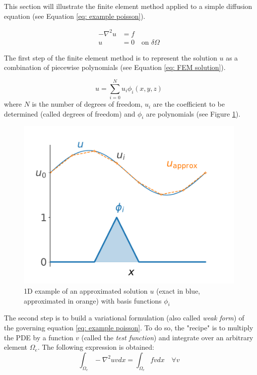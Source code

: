 This section will illustrate the finite element method applied to a simple diffusion equation (see Equation \ref{eq: example poisson}).

\begin{align}
    -\nabla^2 u &= f \\
    u &= 0 \quad \text{on    } \delta \Omega
    \label{eq: example poisson}
\end{align}

The first step of the finite element method is to represent the solution $u$ as a combination of piecewise polynomials (see Equation \ref{eq: FEM solution}).

\begin{equation}
    u = \sum^N_{i=0}u_i \phi_i(x, y, z)
    \label{eq: FEM solution}
\end{equation}
where $N$ is the number of degrees of freedom, $u_i$ are the coefficient to be determined (called degrees of freedom) and $\phi_i$ are polynomials (see Figure \ref{fig: example approximated solution}).

\begin{figure}
    \centering
    \includegraphics[width=\linewidth]{Figures/Chapter2/approximated_solution.pdf}
    \caption{1D example of an approximated solution $u$ (exact in blue, approximated in orange) with basis functions $\phi_i$}
    \label{fig: example approximated solution}
\end{figure}


The second step is to build a variational formulation (also called \textit{weak form}) of the governing equation \ref{eq: example poisson}.
To do so, the "recipe" is to multiply the PDE by a function $v$ (called the \textit{test function}) and integrate over an arbitrary element $\Omega_e$.
The following expression is obtained:
\begin{equation}
    \int_{\Omega_e} -\nabla^2 u v dx = \int_{\Omega_e} f v dx \quad \forall v
    \label{eq: weak form 1}
\end{equation}

